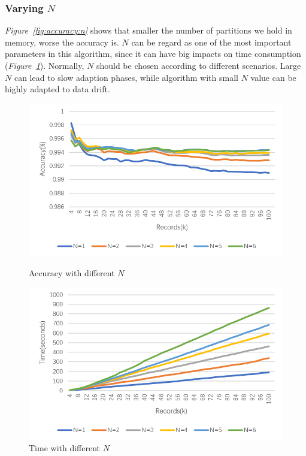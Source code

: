 \documentclass[runningheads]{llncs}
\begin{document}
	\subsubsection{Varying $N$}
	\textit{Figure~\ref{fig:accuracy:n}} shows that smaller the number of partitions we hold in memory, worse the accuracy is. $N$ can be regard as one of the most important parameters in this algorithm, since it can have big impacts on time consumption (\textit{Figure~\ref{fig:time:n}}). Normally, $N$ should be chosen according to different scenarios. Large $N$ can lead to slow adaption phases, while algorithm with small $N$ value can be highly adapted to data drift.
	
	\begin{figure}
		\centering
		\begin{minipage}[t]{0.46\textwidth}
			\centering
			\includegraphics[width=1.0\textwidth]{figure-n-accuracy}
			\caption{Accuracy with different $N$}
			\label{fig:accuracy:n}
		\end{minipage}
		\hspace{3mm}
		\begin{minipage}[t]{0.46\textwidth}
			\centering
			\includegraphics[width=1.0\textwidth]{figure-n-time}
			\caption{Time with different $N$}
			\label{fig:time:n}
		\end{minipage}%
	\end{figure}
\end{document}
